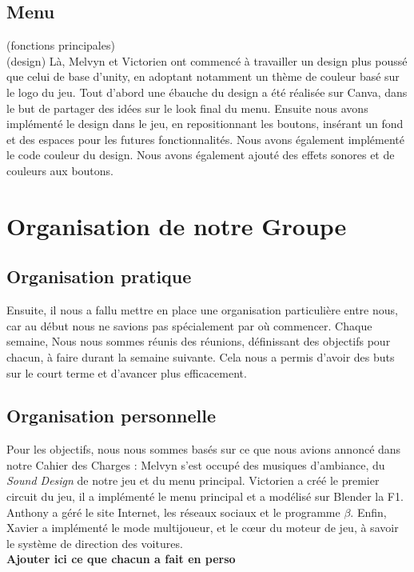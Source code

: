 \documentclass[12pt,a4paper]{article}
\begin{document}
    \subsection{Menu}

        (fonctions principales)\\
        (design)
        Là, Melvyn et Victorien ont commencé à travailler un design plus poussé que celui de base d'unity, en adoptant notamment un thème de couleur basé sur le logo du jeu.
        Tout d'abord une ébauche du design a été réalisée sur Canva, dans le but de partager des idées sur le look final du menu.
        Ensuite nous avons implémenté le design dans le jeu, en repositionnant les boutons, insérant un fond et des espaces pour les futures fonctionnalités. Nous avons également implémenté le code couleur du design.
        Nous avons également ajouté des effets sonores et de couleurs aux boutons.

\clearpage

\section{Organisation de notre Groupe}
    \subsection{Organisation pratique}
    Ensuite, il nous a fallu mettre en place une organisation particulière 
    entre nous, car au début nous ne savions pas spécialement par où commencer.
    Chaque semaine, Nous nous sommes réunis des réunions, définissant des 
    objectifs pour chacun, à faire durant la semaine suivante. Cela nous 
    a permis d’avoir des buts sur le court terme et d'avancer plus 
    efficacement.

    \subsection{Organisation personnelle}
    Pour les objectifs, nous nous 
    sommes basés sur ce que nous avions annoncé dans notre Cahier des 
    Charges :
    Melvyn s'est occupé des musiques d'ambiance, du \textit{Sound Design} de 
    notre jeu et du menu principal. Victorien a créé le premier circuit du jeu,
    il a implémenté le menu principal et a modélisé sur Blender la F1. Anthony a
    géré le site Internet, les réseaux sociaux et le programme \(\beta\).
    Enfin, Xavier a implémenté le mode multijoueur, et le cœur du moteur de jeu,
    à savoir le système de direction des voitures.\\
    {\bfseries Ajouter ici ce que chacun a fait en perso}
\end{document}
